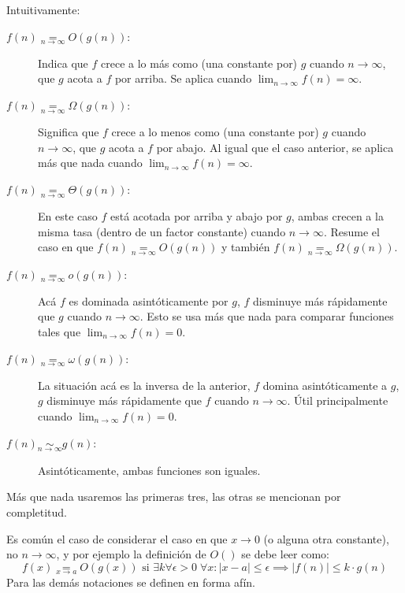  Intuitivamente:
  \begin{description}
  \item[\boldmath
	  \(f(n) \underset{n \rightarrow \infty}{=} O(g(n))\):%
	\unboldmath]
    Indica que \(f\) crece a lo más como (una constante por) \(g\)
    cuando \(n \rightarrow \infty\),
    que \(g\) acota a \(f\) por arriba.
    Se aplica
    cuando \(\lim_{n \rightarrow \infty} f(n) = \infty\).
  \item[\boldmath
	  \(f(n) \underset{n \rightarrow \infty}{=} \Omega(g(n))\):%
	\unboldmath]
    Significa que \(f\)
    crece a lo menos como (una constante por) \(g\)
    cuando \(n \rightarrow \infty\),
    que \(g\) acota a \(f\) por abajo.
    Al igual que el caso anterior,
    se aplica más que nada
    cuando \(\lim_{n \rightarrow \infty} f(n) = \infty\).
  \item[\boldmath
	  \(f(n) \underset{n \rightarrow \infty}{=} \Theta(g(n))\):%
	\unboldmath]
    En este caso \(f\) está acotada por arriba y abajo por \(g\),
    ambas crecen a la misma tasa
    (dentro de un factor constante)
    cuando  \(n \rightarrow \infty\).
    Resume el caso en que
      \(f(n) \underset{n \rightarrow \infty}{=} O(g(n))\)
    y también
      \(f(n) \underset{n \rightarrow \infty}{=} \Omega(g(n))\).
  \item[\boldmath
	  \(f(n) \underset{n \rightarrow \infty}{=} o(g(n))\):%
	\unboldmath]
    Acá \(f\) es dominada asintóticamente por \(g\),
    \(f\) disminuye más rápidamente que \(g\)
    cuando  \(n \rightarrow \infty\).
    Esto se usa más que nada para comparar funciones
    tales que \(\lim_{n \rightarrow \infty} f(n) = 0\).
  \item[\boldmath
	  \(f(n) \underset{n \rightarrow \infty}{=} \omega(g(n))\):%
	\unboldmath]
    La situación acá es la inversa de la anterior,
    \(f\) domina asintóticamente a \(g\),
    \(g\) disminuye más rápidamente que \(f\)
    cuando  \(n \rightarrow \infty\).
    Útil principalmente cuando
      \(\lim_{n \rightarrow \infty} f(n) = 0\).
  \item[\boldmath
	  \(f(n) \underset{n \rightarrow \infty}{\sim} g(n)\):%
	\unboldmath]
    Asintóticamente,
    ambas funciones son iguales.
  \end{description}
  Más que nada usaremos las primeras tres,
  las otras se mencionan por completitud.

  Es común el caso de considerar el caso en que \(x \rightarrow 0\)
  (o alguna otra constante),
  no \(n \rightarrow \infty\),
  y por ejemplo la definición de \(O()\) se debe leer como:
  \begin{equation*}
    f(x)
      \underset{x \rightarrow a}{=} O(g(x))
	 \text{\ si\ }
	   \exists k
	     \forall \epsilon > 0 \; \forall x \colon
	       \lvert x - a \rvert \le \epsilon \implies
		 \lvert f(n) \rvert \le k \cdot g(n)
  \end{equation*}
  Para las demás notaciones se definen en forma afín.

